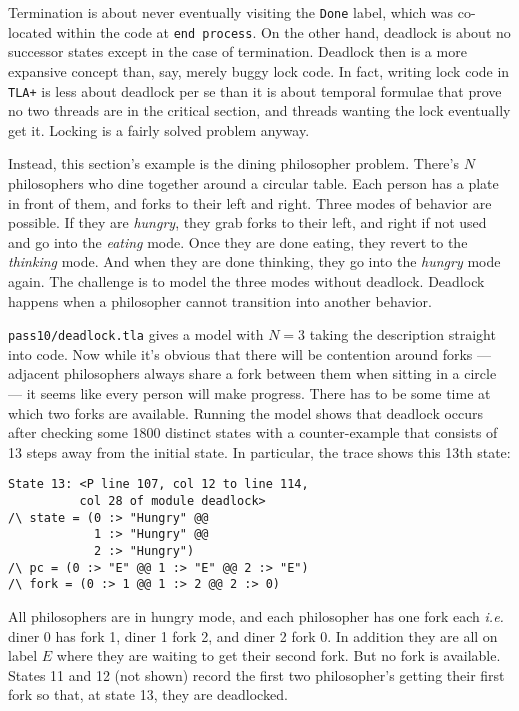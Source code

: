 \documentclass[twocolumn]{article}
\begin{document}
\noindent Termination is about never eventually visiting the \texttt{Done} label, which was co-located within the code at \texttt{end process}. On the other hand, deadlock is about no successor states except in the case of termination. Deadlock then is a more expansive concept than, say, merely buggy lock code. In fact, writing lock code in \texttt{TLA+} is less about deadlock per se than it is about temporal formulae that prove no two threads are in the critical section, and threads wanting the lock eventually get it. Locking is a fairly solved problem anyway. 

Instead, this section's example is the dining philosopher problem. There's $N$ philosophers who dine together around a circular table. Each person has a plate in front of them, and forks to their left and right. Three modes of behavior are possible. If they are \emph{hungry}, they grab forks to their left, and right if not used and go into the \emph{eating} mode. Once they are done eating, they revert to the \emph{thinking} mode. And when they are done thinking, they go into the \emph{hungry} mode again. The challenge is to model the three modes without deadlock. Deadlock happens when a philosopher cannot transition into another behavior. 

\texttt{pass10/deadlock.tla} gives a model with $N=3$ taking the description straight into code. Now while it's obvious that there will be contention around forks --- adjacent philosophers always share a fork between them when sitting in a circle --- it seems like every person will make progress. There has to be some time at which two forks are available. Running the model shows that deadlock occurs after checking some 1800 distinct states with a counter-example that consists of 13 steps away from the initial state. In particular, the trace shows this 13th state:

\begin{verbatim}
State 13: <P line 107, col 12 to line 114,
          col 28 of module deadlock>
/\ state = (0 :> "Hungry" @@ 
            1 :> "Hungry" @@ 
            2 :> "Hungry")
/\ pc = (0 :> "E" @@ 1 :> "E" @@ 2 :> "E")
/\ fork = (0 :> 1 @@ 1 :> 2 @@ 2 :> 0)
\end{verbatim}

All philosophers are in hungry mode, and each philosopher has one fork each \emph{i.e.} diner 0 has fork 1, diner 1 fork 2, and diner 2 fork 0. In addition they are all on label $E$ where they are waiting to get their second fork. But no fork is available. States 11 and 12 (not shown) record the first two philosopher's getting their first fork so that, at state 13, they are deadlocked. 
\end{document}
